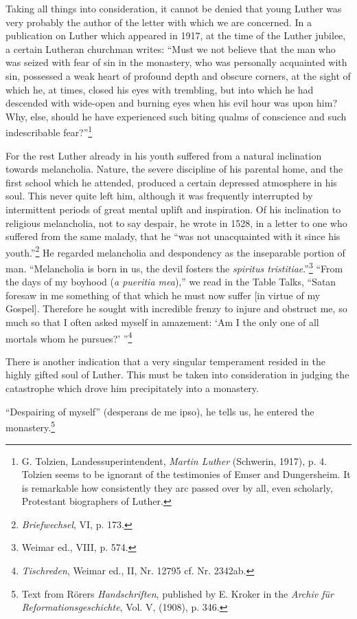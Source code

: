Taking all things into consideration, it cannot be denied that
young Luther was very probably the author of the letter with which
we are concerned. In a publication on Luther which appeared in
1917, at the time of the Luther jubilee, a certain Lutheran churchman
writes: “Must we not believe that the man who was seized with fear
of sin in the monastery, who was personally acquainted with sin,
possessed a weak heart of profound depth and obscure corners, at
the sight of which he, at times, closed his eyes with trembling, but
into which he had descended with wide-open and burning eyes when
his evil hour was upon him? Why, else, should he have experienced
such biting qualms of conscience and such indescribable fear?”\footnote
{G. Tolzien, Landessuperintendent, \textit{Martin Luther} (Schwerin, 1917), p. 4. Tolzien
seems to be ignorant of the testimonies of Emser and Dungersheim. It is remarkable how
consistently they arc passed over by all, even scholarly, Protestant biographers of Luther.}

For the rest Luther already in his youth suffered from a natural inclination
towards melancholia. Nature, the severe discipline of his parental
home, and the first school which he attended, produced a certain
depressed atmosphere in his soul. This never quite left him, although
it was frequently interrupted by intermittent periods of great mental
uplift and inspiration. Of his inclination to religious melancholia,
not to say despair, he wrote in 1528, in a letter to one who suffered
from the same malady, that he “was not unacquainted with it since
his youth.”\footnote{\textit{Briefwechsel}, VI, p. 173.}
He regarded melancholia and despondency as the
inseparable portion of man. “Melancholia is born in us, the devil
fosters the \textit{spiritus tristitiae}.”\footnote{Weimar ed., VIII, p. 574.}
“From the days of my boyhood (\textit{a pueritia mea}),”
we read in the Table Talks, “Satan foresaw in me something
of that which he must now suffer [in virtue of my Gospel].
Therefore he sought with incredible frenzy to injure and obstruct
me, so much so that I often asked myself in amazement: `Am I the
only one of all mortals whom he pursues?' ''\footnote{\textit{Tischreden}, Weimar ed., II, Nr. 12795 cf. Nr. 2342ab.}

There is another indication that a very singular temperament
resided in the highly gifted soul of Luther. This must be taken into
consideration in judging the catastrophe which drove him precipitately into a monastery.

“Despairing of myself” (desperans de me ipso), he tells us, he
entered the monastery.\footnote
{Text from Rörers \textit{Handschriften}, published by E. Kroker in the \textit{Archiv für Reformationsgeschichte}, Vol. V, (1908), p. 346.}


